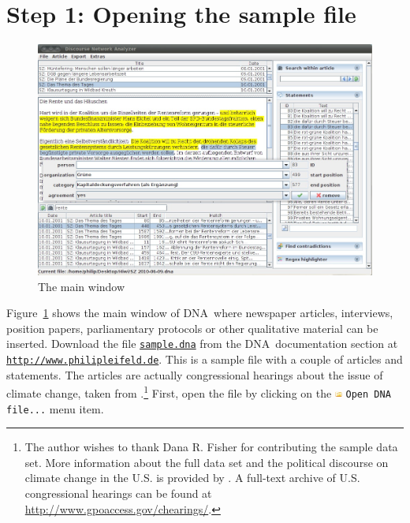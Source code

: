 \documentclass[12pt,a4paper]{scrreprt}
\newcommand{\dnashort}{\textsc{DNA}}
\newcommand{\code}[1]{\texttt{#1}}
\begin{document}
\section*{Step 1: Opening the sample file}
\begin{figure}[t]
\begin{center}
\includegraphics[scale=0.4]{dna-main.jpg}
\end{center}
\caption{The main window}
\label{main}
\end{figure}
Figure~\ref{main} shows the main window of \dnashort\ where newspaper articles, interviews, position papers, parliamentary protocols or other qualitative material can be inserted. Download the file \href{http://www.philipleifeld.de/cms/upload/Downloads/sample.dna}{\texttt{sample.dna}} from the \dnashort\ documentation section at \href{http://www.philipleifeld.de/discourse-network-analyzer-dna/documentation/}{\texttt{http://www.philipleifeld.de}}. This is a sample file with a couple of articles and statements. The articles are actually congressional hearings about the issue of climate change, taken from \citet{fisher2012mapping}.\footnote{The author wishes to thank Dana R. Fisher for contributing the sample data set. More information about the full data set and the political discourse on climate change in the U.S. is provided by \citet{fisher2012mapping}. A full-text archive of U.S. congressional hearings can be found at \url{http://www.gpoaccess.gov/chearings/}.} First, open the file by clicking on the \includegraphics[height=9px]{icons-open.png} \code{Open DNA file...} menu item.
\end{document}
